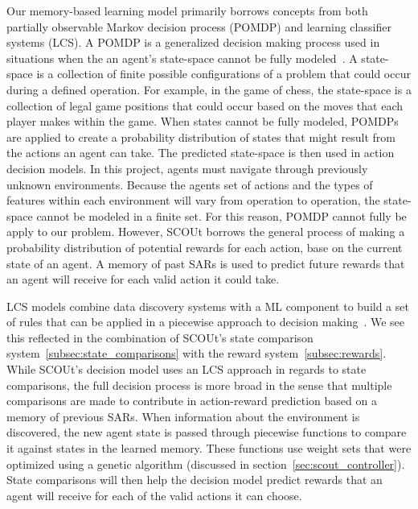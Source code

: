 Our memory-based learning model primarily borrows concepts from both partially observable Markov decision process (POMDP) and learning classifier systems (LCS).
A POMDP is a generalized decision making process used in situations when the an agent's state-space cannot be fully modeled~\cite{r_cassandra_survey_1998, shani_survey_2013}.
A state-space is a collection of finite possible configurations of a problem that could occur during a defined operation.
For example, in the game of chess, the state-space is a collection of legal game positions that could occur based on the moves that each player makes within the game.
When states cannot be fully modeled, POMDPs are applied to create a probability distribution of states that might result from the actions an agent can take.
The predicted state-space is then used in action decision models.
In this project, agents must navigate through previously unknown environments.
Because the agents set of actions and the types of features within each environment will vary from operation to operation, the state-space cannot be modeled in a finite set.
For this reason, POMDP cannot fully be apply to our problem.
However, SCOUt borrows the general process of making a probability distribution of potential rewards for each action, base on the current state of an agent.
A memory of past SARs is used to predict future rewards that an agent will receive for each valid action it could take.

LCS models combine data discovery systems with a ML component to build a set of rules that can be applied in a piecewise approach to decision making~\cite{sigaud_learning_2007}.
We see this reflected in the combination of SCOUt's state comparison system~\ref{subsec:state_comparisons} with the reward system~\ref{subsec:rewards}.
While SCOUt's decision model uses an LCS approach in regards to state comparisons, the full decision process is more broad in the sense that multiple comparisons are made to contribute in action-reward prediction based on a memory of previous SARs.
When information about the environment is discovered, the new agent state is passed through piecewise functions to compare it against states in the learned memory.
These functions use weight sets that were optimized using a genetic algorithm (discussed in section~\ref{sec:scout_controller}).
State comparisons will then help the decision model predict rewards that an agent will receive for each of the valid actions it can choose.





